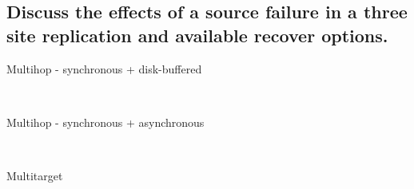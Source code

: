 
\subsection{Discuss the effects of a source failure in a three site replication and available recover options.} %
\label{sub:discuss_the_effects_of_a_source_failure_in_a_three_site_replication_and_available_recover_options}

	\begin{description}
		\item[Multihop - synchronous + disk-buffered] \hfill \\
		\item[Multihop - synchronous + asynchronous] \hfill \\
		\item[Multitarget] \hfill \\
	\end{description}


